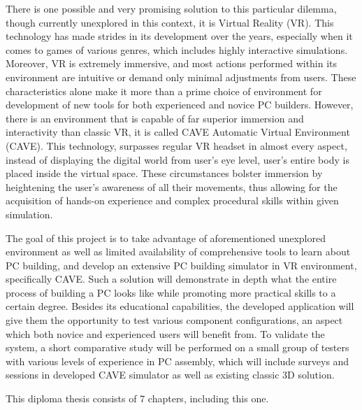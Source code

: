 There is one possible and very promising solution to this particular dilemma, though currently unexplored in this context, it is Virtual Reality (VR).
This technology has made strides in its development over the years, especially when it comes to games of various genres, which includes highly interactive simulations.
Moreover, VR is extremely immersive, and most actions performed within its environment are intuitive or demand only minimal adjustments from users.
These characteristics alone make it more than a prime choice of environment for development of new tools for both experienced and novice PC builders.
However, there is an environment that is capable of far superior immersion and interactivity than classic VR, it is called CAVE Automatic Virtual Environment (CAVE).
This technology, surpasses regular VR headset in almost every aspect, instead of displaying the digital world from user's eye level, user's entire body is placed inside the virtual space.
These circumstances bolster immersion by heightening the user's awareness of all their movements, thus allowing for the acquisition of hands-on experience and complex procedural skills within given simulation.

The goal of this project is to take advantage of aforementioned unexplored environment as well as limited availability of comprehensive tools to learn about PC building, and develop an extensive PC building simulator in VR environment, specifically CAVE.
Such a solution will demonstrate in depth what the entire process of building a PC looks like while promoting more practical skills to a certain degree.
Besides its educational capabilities, the developed application will give them the opportunity to test various component configurations, an aspect which both novice and experienced users will benefit from.
To validate the system, a short comparative study will be performed on a small group of testers with various levels of experience in PC assembly, which will include surveys and sessions in developed CAVE simulator as well as existing classic 3D solution.

This diploma thesis consists of 7 chapters, including this one.

